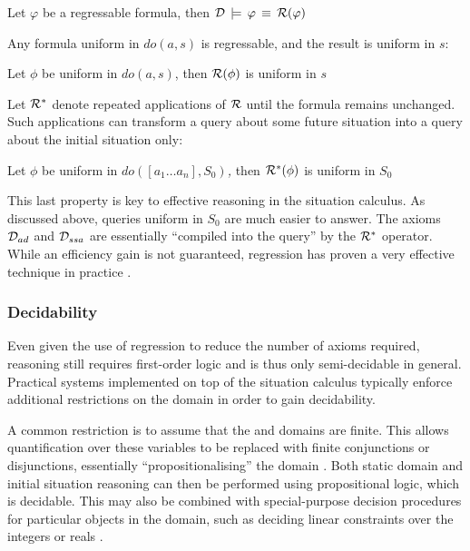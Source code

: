 \begin{prop}
Let $\varphi$ be a regressable formula, then $\mathcal{D}\,\models\,\varphi\,\equiv\,\mathcal{R}(\varphi)$ 
\end{prop}
Any formula uniform in $do(a,s)$ is regressable, and the result is
uniform in $s$:

\begin{prop}
Let $\phi$ be uniform in $do(a,s)$, then $\mathcal{R}(\phi)$ is uniform
in $s$ 
\end{prop}
Let $\mathcal{R}^{*}$ denote repeated applications of $\mathcal{R}$ until the
formula remains unchanged. Such applications can transform a query
about some future situation into a query about the initial situation
only:

\begin{prop}
Let $\phi$ be uniform in \emph{$do([a_{1}\dots a_{n}],S_{0})$,}
then $\mathcal{R}^{*}(\phi)$ is uniform in $S_{0}$ 
\end{prop}
This last property is key to effective reasoning in the situation
calculus. As discussed above, queries uniform in $S_{0}$ are much
easier to answer. The axioms $\mathcal{D}_{ad}$ and $\mathcal{D}_{ssa}$ are essentially
{}``compiled into the query'' by the $\mathcal{R}^{*}$ operator. While
an efficiency gain is not guaranteed, regression has proven a very
effective technique in practice \citep{levesque97golog,pirri99contributions_sitcalc}.


\subsubsection{Decidability}

Even given the use of regression to reduce the number of axioms required,
reasoning still requires first-order logic and is thus only semi-decidable
in general. Practical systems implemented on top of the situation
calculus typically enforce additional restrictions on the domain in
order to gain decidability.

A common restriction is to assume that the  and 
domains are finite. This allows quantification over these variables
to be replaced with finite conjunctions or disjunctions, essentially
{}``propositionalising'' the domain \citep{giacomo99impl_robots,reiter01kia,levesque04krr_book}.
Both static domain and initial situation reasoning can then be performed
using propositional logic, which is decidable. This may also be combined
with special-purpose decision procedures for particular objects in
the domain, such as deciding linear constraints over the integers
or reals \citep{reiter96sc_nat_conc,reiter01kia}.

